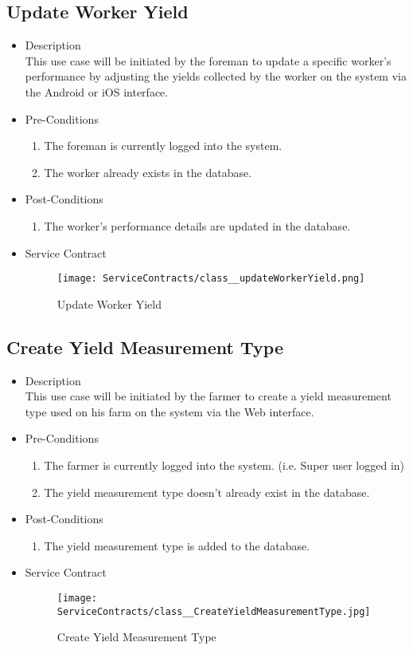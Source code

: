 \documentclass[11pt,fleqn]{book} %
\begin{document}
\subsection{Update Worker Yield}
\begin{itemize}
	\item Description\\
	This use case will be initiated by the foreman to update a specific worker’s performance by adjusting the yields collected by the worker on the system via the Android or iOS interface.
	\item Pre-Conditions
	\begin{enumerate}
		\item The foreman is currently logged into the system.
		\item The worker already exists in the database.			
	\end{enumerate}
	\item Post-Conditions
	\begin{enumerate}
		\item The worker’s performance details are updated in the database.
	\end{enumerate}
	\item Service Contract
	\begin{figure}
		\texttt{[image: ServiceContracts/class\_\_updateWorkerYield.png]}
		\caption{Update Worker Yield}
	\end{figure}
\end{itemize}

\subsection{Create Yield Measurement Type}
\begin{itemize}
	\item Description\\
	This use case will be initiated by the farmer to create a yield measurement type used on his farm on the system via the Web interface.
	\item Pre-Conditions
	\begin{enumerate}
		\item The farmer is currently logged into the system. (i.e. Super user logged in)
		\item The yield measurement type doesn’t already exist in the database. 				
	\end{enumerate}
	\item Post-Conditions
	\begin{enumerate}
		\item The yield measurement type is added to the database.
	\end{enumerate}
	\item Service Contract
	\begin{figure}
		\texttt{[image: ServiceContracts/class\_\_CreateYieldMeasurementType.jpg]}
		\caption{Create Yield Measurement Type}
	\end{figure}
\end{itemize}
\end{document}
